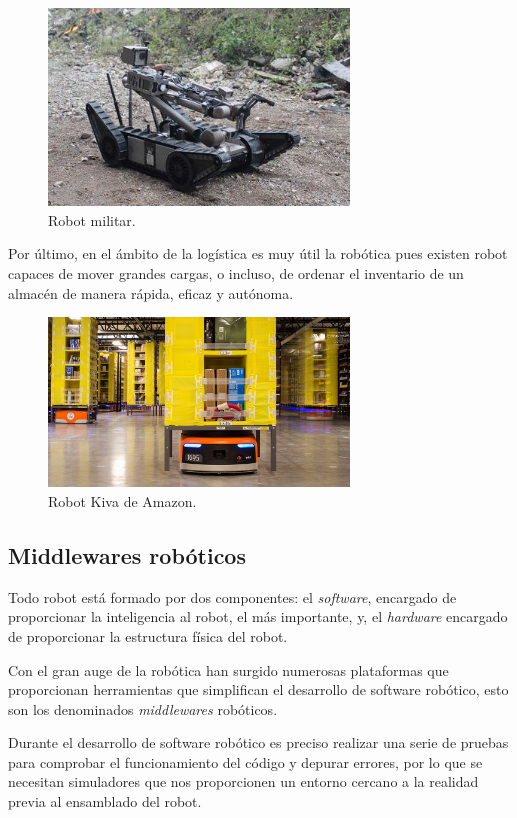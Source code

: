 \documentclass[a4paper, 12pt]{book}
\begin{document}
\begin{figure}[H]
	\centering
    \includegraphics[width=8cm]{img/robot_militar}
    \caption{Robot militar.}
    \label{figura:coche_autonomo}
\end{figure}

Por último, en el ámbito de la logística es muy útil la robótica pues existen robot capaces de mover grandes cargas, o incluso, de ordenar el inventario de un almacén de manera rápida, eficaz y autónoma.

\begin{figure}[H]
	\centering
    \includegraphics[width=8cm]{img/Robot-Kiva-de-Amazon.jpg}
    \caption{Robot Kiva de Amazon.}
    \label{figura:coche_autonomo}
\end{figure}

\subsection{Middlewares robóticos}
\label{subsec:middlewares}

Todo robot está formado por dos componentes: el \textit{software}, encargado de proporcionar la inteligencia al robot, el más importante, y, el \textit{hardware} encargado de proporcionar la estructura física del robot.

Con el gran auge de la robótica han surgido numerosas plataformas que proporcionan herramientas que simplifican el desarrollo de software robótico, esto son los denominados \textit{middlewares} robóticos.

Durante el desarrollo de software robótico es preciso realizar una serie de pruebas para comprobar el funcionamiento del código y depurar errores, por lo que se necesitan simuladores que nos proporcionen un entorno cercano a la realidad previa al ensamblado del robot.
\end{document}
